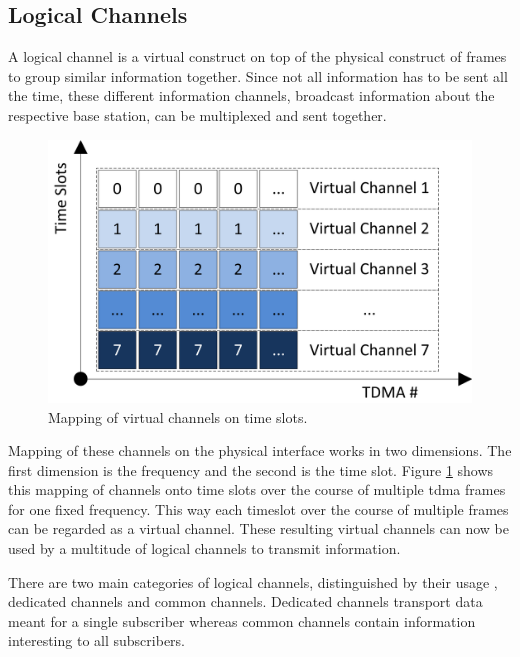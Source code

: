 \subsection{Logical Channels}
\label{sec:channels}
A logical channel is a virtual construct on top of the physical construct of frames to group similar information together.
Since not all information has to be sent all the time, these different information channels, \eg broadcast information about the respective base station, can be multiplexed and sent together.
\begin{figure}
	\centering
	\includegraphics{../Images/Channels}
	\caption{Mapping of virtual channels on time slots.}
	\label{fig:channels}
\end{figure}

Mapping of these channels on the physical interface works in two dimensions.
The first dimension is the frequency and the second is the time slot.
Figure \ref{fig:channels} shows this mapping of channels onto time slots over the course of multiple \gls{tdma} frames for one fixed frequency.
This way each timeslot over the course of multiple frames can be regarded as a virtual channel.
These resulting virtual channels can now be used by a multitude of logical channels to transmit information.

There are two main categories of logical channels, distinguished by their usage \cite{kommsys2006}, dedicated channels and common channels.
Dedicated channels transport data meant for a single subscriber whereas common channels contain information interesting to all subscribers.

